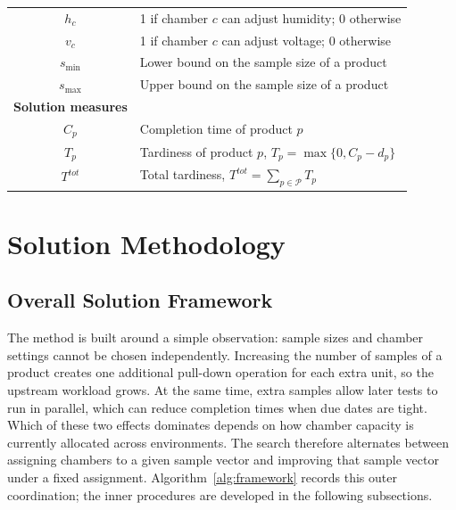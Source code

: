 \documentclass[11pt]{article}
\begin{document}
\begin{table}[H]
\begin{tabular}{cl}
\(h_c\) & 1 if chamber \(c\) can adjust humidity; 0 otherwise \\
\(v_c\) & 1 if chamber \(c\) can adjust voltage; 0 otherwise \\
\(s_{\min}\) & Lower bound on the sample size of a product \\
\(s_{\max}\) & Upper bound on the sample size of a product \\
\midrule
\textbf{Solution measures} & \\
\midrule
\(C_p\) & Completion time of product \(p\) \\
\(T_p\) & Tardiness of product \(p\), \(T_p=\max\{0,C_p-d_p\}\) \\
\(T^{tot}\) & Total tardiness, \(T^{tot}=\sum_{p\in\mathcal{P}}T_p\) \\
\bottomrule
\end{tabular}
\end{table}

\section{Solution Methodology}
\label{sec:solution}

\subsection{Overall Solution Framework}
\label{subsec:framework}

The method is built around a simple observation: sample sizes and
chamber settings cannot be chosen independently.
Increasing the number of samples of a product creates one additional
pull-down operation for each extra unit, so the upstream workload
grows.
At the same time, extra samples allow later tests to run in parallel,
which can reduce completion times when due dates are tight.
Which of these two effects dominates depends on how chamber capacity
is currently allocated across environments.
The search therefore alternates between assigning chambers to a given
sample vector and improving that sample vector under a fixed
assignment.
Algorithm~\ref{alg:framework} records this outer coordination;
the inner procedures are developed in the following subsections.
\end{document}
